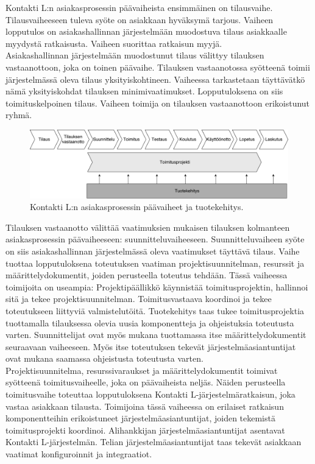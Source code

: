 \documentclass[finnish,12pt,a4paper,pdftex]{article}
\begin{document}
Kontakti L:n asiakasprosessin päävaiheista ensimmäinen on tilausvaihe. Tilausvaiheeseen tuleva syöte on asiakkaan hyväksymä tarjous. Vaiheen lopputulos on asiakashallinnan järjestelmään muodostuva tilaus asiakkaalle myydystä ratkaisusta. Vaiheen suorittaa ratkaisun myyjä.\\

\noindent Asiakashallinnan järjestelmään muodostunut tilaus välittyy tilauksen vastaanottoon, joka on toinen päävaihe. Tilauksen vastaanotossa syötteenä toimii järjestelmässä oleva tilaus yksityiskohtineen. Vaiheessa tarkastetaan täyttävätkö nämä yksityiskohdat tilauksen minimivaatimukset. Lopputuloksena on siis toimituskelpoinen tilaus. Vaiheen toimija on tilauksen vastaanottoon erikoistunut ryhmä.\\

\begin{figure}[!h]
    \centering
    \includegraphics[scale=0.4]{images/ODI-prosessi.pdf}
    \caption{Kontakti L:n asiakasprosessin päävaiheet ja tuotekehitys.}
    \label{fig:paavaih}
\end{figure}


\noindent Tilauksen vastaanotto välittää vaatimuksien mukaisen tilauksen kolmanteen asiakasprosessin päävaiheeseen: suunnitteluvaiheeseen. Suunnitteluvaiheen syöte on siis asiakashallinnan järjestelmässä oleva vaatimukset täyttävä tilaus. Vaihe tuottaa lopputuloksena toteutuksen vaatiman projektisuunnitelman, resurssit ja määrittelydokumentit, joiden perusteella toteutus tehdään. Tässä vaiheessa toimijoita on useampia: Projektipäällikkö käynnistää toimitusprojektin, hallinnoi sitä ja tekee projektisuunnitelman. Toimitusvastaava koordinoi ja tekee toteutukseen liittyviä valmistelutöitä. Tuotekehitys taas tukee toimitusprojektia tuottamalla tilauksessa olevia uusia komponentteja ja ohjeistuksia toteutusta varten. Suunnittelijat ovat myös mukana tuottamassa itse määrittelydokumentit seuraavaan vaiheeseen. Myös itse toteutuksen tekevät järjestelmäasiantuntijat ovat mukana saamassa ohjeistusta toteutusta varten.\\

\noindent Projektisuunnitelma, resurssivaraukset ja määrittelydokumentit toimivat syötteenä toimitusvaiheelle, joka on päävaiheista neljäs. Näiden perusteella toimitusvaihe toteuttaa lopputuloksena Kontakti L-järjestelmäratkaisun, joka vastaa asiakkaan tilausta. Toimijoina tässä vaiheessa on erilaiset ratkaisun komponentteihin erikoistuneet järjestelmäasiantuntijat, joiden tekemistä toimitusprojekti koordinoi. Alihankkijan järjestelmäasiantuntijat asentavat Kontakti L-järjestelmän. Telian järjestelmäasiantuntijat taas tekevät asiakkaan vaatimat konfiguroinnit ja integraatiot. \\
\end{document}
